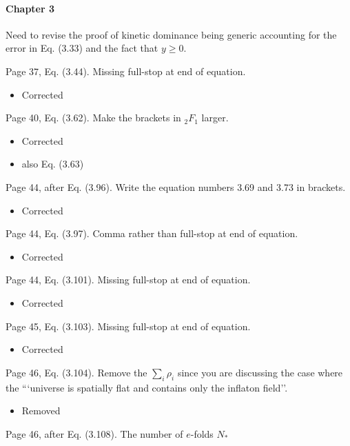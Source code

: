 \documentclass[11pt]{article}
\newcommand{\todo}[1]{{\color{red} #1}}
\begin{document}
\paragraph{Chapter 3}
\begin{enumerate}
    \todo{
\item Need to revise the proof of kinetic dominance being generic
  accounting for the error in Eq. (3.33) and the fact that $y\geq 0$.
}
\item Page 37, Eq. (3.44). Missing full-stop at end of equation.
  \begin{itemize}
    \item Corrected
  \end{itemize}
\item Page 40, Eq. (3.62). Make the brackets in ${}_2 F_1$ larger.
  \begin{itemize}
    \item Corrected
    \item also Eq. (3.63)
  \end{itemize}
\item Page 44, after Eq. (3.96). Write the equation numbers 3.69 and
  3.73 in brackets.
  \begin{itemize}
    \item Corrected
  \end{itemize}
\item Page 44, Eq. (3.97). Comma rather than full-stop at end of
  equation.
  \begin{itemize}
    \item Corrected
  \end{itemize}
\item Page 44, Eq. (3.101). Missing full-stop at end of equation.
  \begin{itemize}
    \item Corrected
  \end{itemize}
\item Page 45, Eq. (3.103). Missing full-stop at end of equation.
  \begin{itemize}
    \item Corrected
  \end{itemize}
\item Page 46, Eq. (3.104). Remove the $\sum_i \rho_i$ since you are
  discussing the case where the ```universe is spatially flat and
  contains only the inflaton field''.
  \begin{itemize}
    \item Removed
  \end{itemize}
\item Page 46, after Eq. (3.108). The number of $e$-folds $N_\ast$

\end{enumerate}
\end{document}
